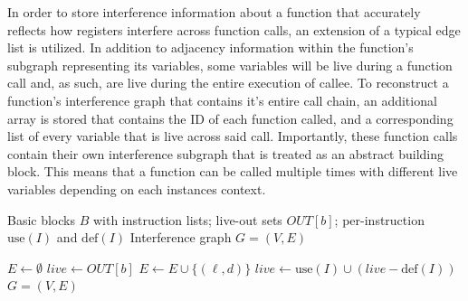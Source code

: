\documentclass{article}
\begin{document}
In order to store interference information about a function that accurately reflects how registers interfere across function calls, an extension of a typical edge list is utilized. In addition to adjacency information within the function's subgraph representing its variables, some variables will be live during a function call and, as such, are live during the entire execution of callee. To reconstruct a function's interference graph that contains it's entire call chain, an additional array is stored that contains the ID of each function called, and a corresponding list of every variable that is live across said call. Importantly, these function calls contain their own interference subgraph that is treated as an abstract building block. This means that a function can be called multiple times with different live variables depending on each instances context.

\begin{algorithm}[H]
\caption{Building an Interference Graph While Treating Functions as an Independent Set}\label{alg:iggen}
\begin{algorithmic}[1]
\Require Basic blocks $B$ with instruction lists; live-out sets $\textit{OUT}[b]$; per-instruction $\mathrm{use}(I)$ and $\mathrm{def}(I)$
\Ensure Interference graph $G = (V, E)$

\State $E \gets \emptyset$
    \State $\textit{live} \gets \textit{OUT}[b]$
                    \State $E \gets E \cup \{(\ell, d)\}$ 
                \EndIf
            \EndFor
        \EndFor
        \State $\textit{live} \gets \mathrm{use}(I) \cup (\textit{live} - \mathrm{def}(I))$
    \EndFor
\EndFor
\State \Return $G = (V, E)$
\end{algorithmic}
\end{algorithm}
\end{document}
